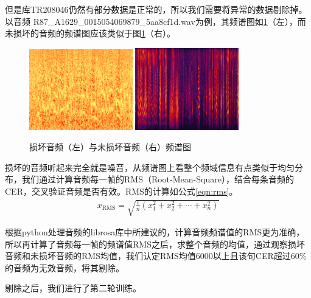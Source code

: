 但是库TR208046仍然有部分数据是正常的，所以我们需要将异常的数据剔除掉。以音频 R87\_A1629\_0015054069879\_5aa8cf1d.wav为例，其频谱图如\ref{fig:audio-freq}（左），而未损坏的音频的频谱图应该类似于图\ref{fig:audio-freq}（右）。
\begin{figure}[!ht]
	\centering
	\includegraphics[width=0.40\textwidth]{figure/error-audio}
	\hspace{1cm}
	\includegraphics[width=0.40\textwidth]{figure/right-audio}
	\caption{损坏音频（左）与未损坏音频（右）频谱图}
\label{fig:audio-freq}
\end{figure}

损坏的音频听起来完全就是噪音，从频谱图上看整个频域信息有点类似于均匀分布，我们通过计算音频每一帧的RMS（Root-Mean-Square），结合每条音频的CER，交叉验证音频是否有效。RMS的计算如公式\ref{eqn:rms}。
\begin{align}
\label{eqn:rms}
	x_{\mathrm{RMS}}=\sqrt{\frac{1}{n}\left(x_{1}^{2}+x_{2}^{2}+\cdots+x_{n}^{2}\right)}
\end{align}

根据python处理音频的librosa库中所建议的，计算音频频谱值的RMS更为准确，所以再计算了音频每一帧的频谱值RMS之后，求整个音频的均值，通过观察损坏音频和未损坏音频的RMS均值，我们认定RMS均值6000以上且该句CER超过60\%的音频为无效音频，将其剔除。

剔除之后，我们进行了第二轮训练。

